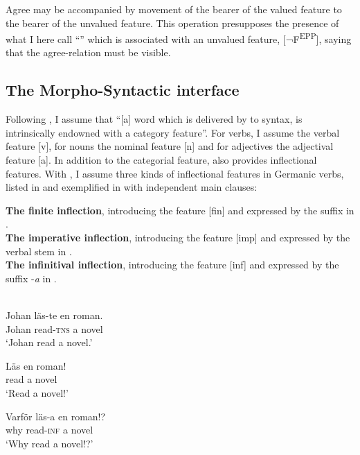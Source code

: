 \documentclass[output=paper]{LSP/langsci}
\begin{document}
Agree may be accompanied by movement of the bearer of the valued feature to the bearer of the unvalued feature. This operation presupposes the presence of what I here call “” which is associated with an unvalued feature, [¬F\textsuperscript{EPP}], saying that the agree-relation must be visible. 

\subsection{The Morpho-Syntactic interface}

Following \citet[14]{CecchettoDonati2015}, I assume that “[a] word which is delivered by  to syntax, is intrinsically endowned with a category feature”. For verbs, I assume the verbal feature [v], for nouns the nominal feature [n] and for adjectives the adjectival feature [a]. In addition to the categorial feature,  also provides inflectional features. With \citet{PlatzackRosengren2017}, I assume three kinds of inflectional features in Germanic verbs, listed in  and exemplified in  with  independent main clauses:

\ea%
    \label{ex:platzack:10}
	 \ea
 \textbf{The finite inflection}, introducing the feature [fin] and expressed by the             suffix in .\\

   \ex
 \textbf{The imperative inflection}, introducing the feature [imp] and expressed by the verbal       stem in .\\

   \ex
 \textbf{The infinitival inflection}, introducing the feature [inf] and expressed by the            suffix -\textit{a} in .\\
\z
\z

 \ea
 \label{ex:platzack:11}  
 \\
   \ea \label{ex:platzack:11a}  
\gll Johan  läs-te    en  roman.\\
      Johan    read-\textsc{tns}  a  novel\\
\glt   ‘Johan read a novel.’

   \ex
\gll Läs  en  roman!\\
      read  a  novel\\
\glt   ‘Read a novel!'        

   \ex
\gll Varför  läs-a    en  roman!?\\
      why    read-\textsc{inf}  a  novel\\
\glt   ‘Why read a novel!?’
\z
\z
\end{document}
